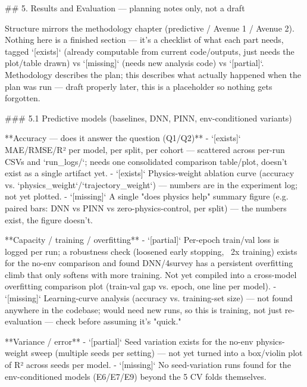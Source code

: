 ## 5. Results and Evaluation — planning notes only, not a draft

Structure mirrors the methodology chapter (predictive / Avenue 1 / Avenue 2). Nothing here is a finished
section — it's a checklist of what each part needs, tagged `[exists]` (already computable from current
code/outputs, just needs the plot/table drawn) vs `[missing]` (needs new analysis code) vs `[partial]`.
Methodology describes the plan; this describes what actually happened when the plan was run — draft
properly later, this is a placeholder so nothing gets forgotten.

### 5.1 Predictive models (baselines, DNN, PINN, env-conditioned variants)

**Accuracy — does it answer the question (Q1/Q2)**
- `[exists]` MAE/RMSE/R² per model, per split, per cohort — scattered across per-run CSVs and `run_logs/`; needs one consolidated comparison table/plot, doesn't exist as a single artifact yet.
- `[exists]` Physics-weight ablation curve (accuracy vs. `physics_weight`/`trajectory_weight`) — numbers are in the experiment log; not yet plotted.
- `[missing]` A single "does physics help" summary figure (e.g. paired bars: DNN vs PINN vs zero-physics-control, per split) — the numbers exist, the figure doesn't.

**Capacity / training / overfitting**
- `[partial]` Per-epoch train/val loss is logged per run; a robustness check (loosened early stopping, ~2x training) exists for the no-env comparison and found DNN/4survey has a persistent overfitting climb that only softens with more training. Not yet compiled into a cross-model overfitting comparison plot (train-val gap vs. epoch, one line per model).
- `[missing]` Learning-curve analysis (accuracy vs. training-set size) — not found anywhere in the codebase; would need new runs, so this is training, not just re-evaluation — check before assuming it's "quick."

**Variance / error**
- `[partial]` Seed variation exists for the no-env physics-weight sweep (multiple seeds per setting) — not yet turned into a box/violin plot of R² across seeds per model.
- `[missing]` No seed-variation runs found for the env-conditioned models (E6/E7/E9) beyond the 5 CV folds themselves.

